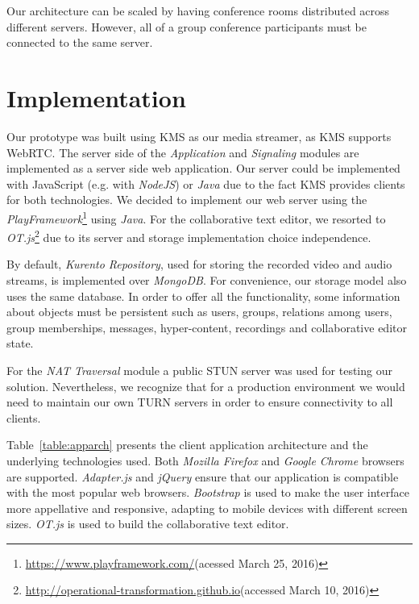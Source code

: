 \documentclass[10pt,conference]{IEEEtran}
\begin{document}
Our architecture can be scaled by having conference rooms distributed across different servers.
However, all of a group conference participants must be connected to the same server.









\section{Implementation}
\label{chapter:implementation}


Our prototype was built using \gls{KMS} as our media streamer, as \gls{KMS} supports \gls{WebRTC}.
The server side of the \emph{Application} and \emph{Signaling} modules are implemented as a server side web application. 
Our server could be implemented with JavaScript (e.g. with \emph{NodeJS}) or \emph{Java} due to the fact \gls{KMS} provides clients for both technologies. 
We decided to implement our web server using the \emph{PlayFramework}\footnote{\url{https://www.playframework.com/}(acessed March 25, 2016)} using \emph{Java}.
For the collaborative text editor, we resorted to \emph{OT.js}\footnote{\url{http://operational-transformation.github.io}(accessed March 10, 2016)} due to its server and storage implementation choice independence.

By default, \emph{Kurento Repository}, used for storing the recorded video and audio streams, is implemented over \emph{MongoDB}.
For convenience, our storage model also uses the same database.
In order to offer all the functionality, some information about objects must be persistent such as users, groups, relations among users, group memberships, messages, hyper-content, recordings and collaborative editor state. 

For the \emph{NAT Traversal} module a public \gls{STUN} server was used for testing our solution.
Nevertheless, we recognize that for a production environment we would need to maintain our own \gls{TURN} servers in order to ensure connectivity to all clients.




Table~\ref{table:apparch} presents the client application architecture and the underlying technologies used.
Both \emph{Mozilla Firefox} and \emph{Google Chrome} browsers are supported.
\emph{Adapter.js} and \emph{jQuery} ensure that our application is compatible with the most popular web browsers.
\emph{Bootstrap} is used to make the user interface more appellative and responsive, adapting to mobile devices with different screen sizes.
\emph{OT.js} is used to build the collaborative text editor.
\end{document}
